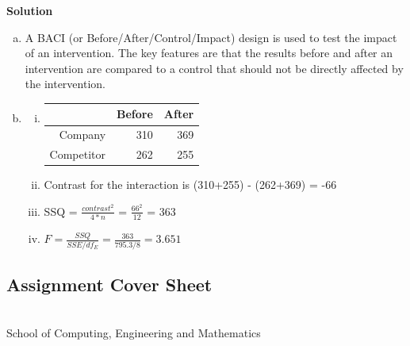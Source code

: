 \documentclass[a4paper,oneside]{book}
\begin{document}
\textbf{Solution}
\begin{enumerate}[a)]
\item A BACI (or Before/After/Control/Impact) design is used to
  test the impact of an intervention. The key features are that the
  results before and after an intervention are compared to a control
  that should not be directly affected by the intervention.
\item \begin{enumerate}[i)]
\item \begin{tabular}{rrr}
  \hline
 & Before & After \\ 
  \hline
Company & 310 & 369 \\ 
  Competitor & 262 & 255 \\ 
   \hline
\end{tabular}
\item Contrast for the interaction is (310+255) - (262+369) = -66
\item SSQ = $\frac{contrast^2}{4*n}$ = $\frac{66^2}{12}$ = 363
\item $F = \frac{SSQ}{SSE/df_E} = \frac{363}{795.3/8} = 3.651$
\end{enumerate}
\end{enumerate}


\subsection*{Assignment Cover Sheet}

\begin{flushright}
 \\[1em]
School of Computing, Engineering and Mathematics \\
\end{flushright}
\end{document}
